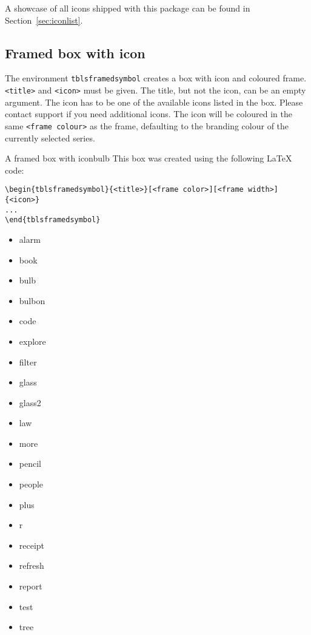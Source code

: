 \documentclass[output=paper]{langscibook}
\begin{document}
A showcase of all icons shipped with this package can be found in Section~\ref{sec:iconlist}.

\subsection{Framed box with icon}

The environment \texttt{tblsframedsymbol} creates a box with icon and coloured frame. \texttt{<title>} and \texttt{<icon>} must be given. The title, but not the icon, can be an empty argument. The icon has to be one of the available icons listed in the box. Please contact \lsp{} support if you need additional icons. The icon will be coloured in the same \texttt{<frame colour>} as the frame, defaulting to the branding colour of the currently selected series.

\begin{tblsframedsymbol}{A framed box with icon}{bulb}
	This box was created using the following \LaTeX{} code:
	
\begin{lstlisting}
\begin{tblsframedsymbol}{<title>}[<frame color>][<frame width>]{<icon>}
...
\end{tblsframedsymbol}
\end{lstlisting}
	
	
	\begin{multicols}{4}
		\begin{itemize}[noitemsep,leftmargin=5mm]
			\item\ttfamily alarm 
			\item\ttfamily book 
			\item\ttfamily bulb 
			\item\ttfamily bulbon 
			\item\ttfamily code 
			\item\ttfamily explore 
			\item\ttfamily filter 
			\item\ttfamily glass 
			\item\ttfamily glass2 
			\item\ttfamily law 
			\item\ttfamily more 
			\item\ttfamily pencil 
			\item\ttfamily people 
			\item\ttfamily plus 
			\item\ttfamily r 
			\item\ttfamily receipt 
			\item\ttfamily refresh 
			\item\ttfamily report 
			\item\ttfamily test 
			\item\ttfamily tree 
		\end{itemize}
	\end{multicols}
\end{tblsframedsymbol}
\end{document}
